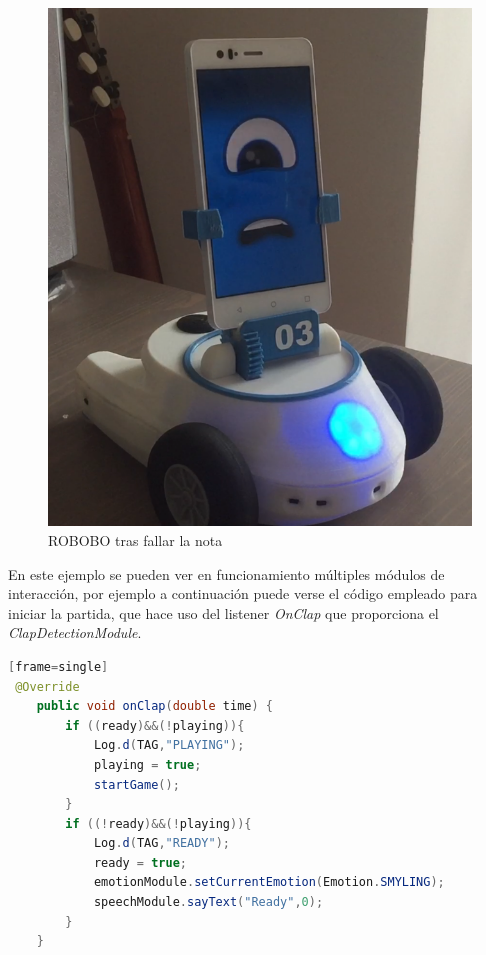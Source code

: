 \begin{figure}
\begin{minipage}{0.45\textwidth}
\end{minipage}\hfill
\begin{minipage}{0.45\textwidth}
\centering
\includegraphics[width=1\linewidth]{imagenes/simon_sad.png}

\caption{ROBOBO tras fallar la nota}
\label{fig:simon-sad}

\end{minipage}
\end{figure}


En este ejemplo se pueden ver en funcionamiento múltiples módulos de interacción, por ejemplo a continuación puede verse el código empleado para iniciar la partida, que hace uso del listener \textit{OnClap} que proporciona el \textit{ClapDetectionModule}.

\vspace{5mm} %

\begin{lstlisting}[language=Java][frame=single]
 @Override
    public void onClap(double time) {
        if ((ready)&&(!playing)){
            Log.d(TAG,"PLAYING");
            playing = true;
            startGame();
        }
        if ((!ready)&&(!playing)){
            Log.d(TAG,"READY");
            ready = true;
            emotionModule.setCurrentEmotion(Emotion.SMYLING);
            speechModule.sayText("Ready",0);
        }
    }

\end{lstlisting}

